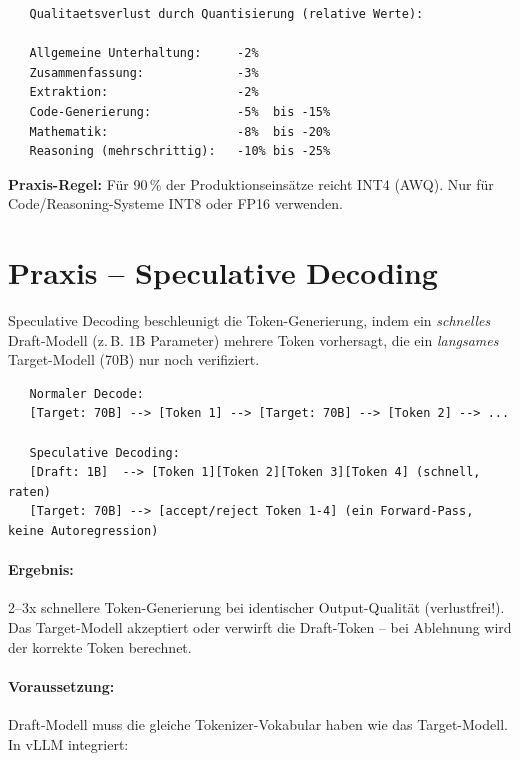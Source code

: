 \begin{verbatim}
   Qualitaetsverlust durch Quantisierung (relative Werte):
   
   Allgemeine Unterhaltung:     -2%
   Zusammenfassung:             -3%
   Extraktion:                  -2%
   Code-Generierung:            -5%  bis -15%
   Mathematik:                  -8%  bis -20%
   Reasoning (mehrschrittig):   -10% bis -25%
\end{verbatim}

\textbf{Praxis-Regel:} Für 90\,\% der Produktionseinsätze reicht INT4 (AWQ). Nur für Code/Reasoning-Systeme INT8 oder FP16 verwenden.


\section{Praxis -- Speculative Decoding}

Speculative Decoding beschleunigt die Token-Generierung, indem ein \textit{schnelles} Draft-Modell (z.\,B. 1B Parameter) mehrere Token vorhersagt, die ein \textit{langsames} Target-Modell (70B) nur noch verifiziert.

\begin{verbatim}
   Normaler Decode:
   [Target: 70B] --> [Token 1] --> [Target: 70B] --> [Token 2] --> ...
   
   Speculative Decoding:
   [Draft: 1B]  --> [Token 1][Token 2][Token 3][Token 4] (schnell, raten)
   [Target: 70B] --> [accept/reject Token 1-4] (ein Forward-Pass, keine Autoregression)
\end{verbatim}

\paragraph{Ergebnis:} 2--3x schnellere Token-Generierung bei identischer Output-Qualität (verlustfrei!). Das Target-Modell akzeptiert oder verwirft die Draft-Token -- bei Ablehnung wird der korrekte Token berechnet.

\paragraph{Voraussetzung:} Draft-Modell muss die gleiche Tokenizer-Vokabular haben wie das Target-Modell. In vLLM integriert:

